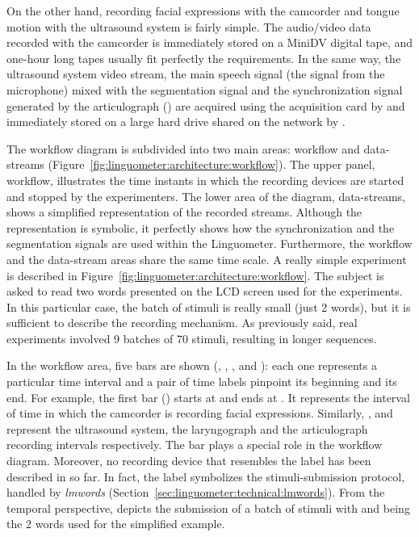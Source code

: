 On the other hand, recording facial expressions with the camcorder and 
tongue motion with the ultrasound system is fairly simple.
The audio/video data recorded with the camcorder is immediately stored on a
MiniDV digital tape, and
one-hour long tapes usually fit perfectly the requirements.
In the same way, the ultrasound system video stream, the main speech signal
(the signal  from the  microphone) mixed with the segmentation
signal and the synchronization signal generated by the articulograph
() are acquired using the  acquisition card by 
and immediately stored on a large hard drive shared on the network by .

The workflow diagram is subdivided into two main areas: workflow and
data-streams (Figure~\ref{fig:linguometer:architecture:workflow}).
The upper panel, workflow, illustrates the time instants in which the 
recording devices are started and stopped by the experimenters.
The lower area of the diagram, data-streams, shows a simplified representation
of the recorded streams.
Although the representation is symbolic, it perfectly shows how the
synchronization and the segmentation signals are used within the Linguometer.
Furthermore, the workflow and the data-stream areas share the same time scale.
A really simple experiment is described in
Figure~\ref{fig:linguometer:architecture:workflow}.
The subject is asked to read two words presented on the LCD screen used
for the experiments.
In this particular case, the batch of stimuli is really small (just 2 words),
but it is sufficient to describe the recording mechanism.
As previously said, real experiments involved 9 batches of 70 stimuli, resulting
in longer sequences.

In the workflow area, five bars are shown (, , ,
 and ): each one represents a particular time interval and a 
pair of time labels pinpoint its beginning and its end.
For example, the first bar () starts at  and ends at 
.
It represents the interval of time in which the camcorder is recording facial 
expressions.
Similarly, ,  and  represent the ultrasound system, the
laryngograph and the articulograph recording intervals respectively.
The  bar plays a special role in the workflow diagram.
Moreover, no recording device that resembles the  label has been
described in so far.
In fact, the  label symbolizes the stimuli-submission protocol, handled 
by \emph{lmwords} (Section~\ref{sec:linguometer:technical:lmwords}).
From the temporal perspective,  depicts the submission of a batch of 
stimuli with  and  being the 2 words used for the simplified
example.


